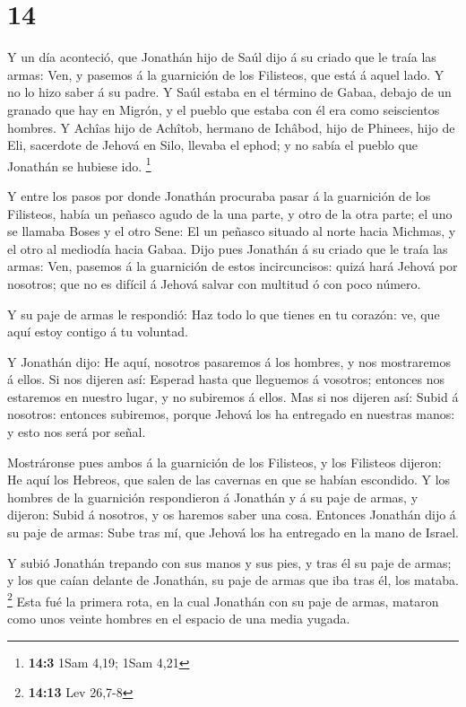 \hypertarget{section-13}{%
\section{14}\label{section-13}}

 Y un día aconteció, que Jonathán hijo de Saúl dijo á su
criado que le traía las armas: Ven, y pasemos á la guarnición de los
Filisteos, que está á aquel lado. Y no lo hizo saber á su padre.
 Y Saúl estaba en el término de Gabaa, debajo de un granado
que hay en Migrón, y el pueblo que estaba con él era como seiscientos
hombres.  Y Achîas hijo de Achîtob, hermano de Ichâbod, hijo
de Phinees, hijo de Eli, sacerdote de Jehová en Silo, llevaba el ephod;
y no sabía el pueblo que Jonathán se hubiese ido. \footnote{\textbf{14:3}
  1Sam 4,19; 1Sam 4,21}

 Y entre los pasos por donde Jonathán procuraba pasar á la
guarnición de los Filisteos, había un peñasco agudo de la una parte, y
otro de la otra parte; el uno se llamaba Boses y el otro Sene:
 El un peñasco situado al norte hacia Michmas, y el otro al
mediodía hacia Gabaa.  Dijo pues Jonathán á su criado que le
traía las armas: Ven, pasemos á la guarnición de estos incircuncisos:
quizá hará Jehová por nosotros; que no es difícil á Jehová salvar con
multitud ó con poco número.

 Y su paje de armas le respondió: Haz todo lo que tienes en
tu corazón: ve, que aquí estoy contigo á tu voluntad.

 Y Jonathán dijo: He aquí, nosotros pasaremos á los hombres,
y nos mostraremos á ellos.  Si nos dijeren así: Esperad
hasta que lleguemos á vosotros; entonces nos estaremos en nuestro lugar,
y no subiremos á ellos.  Mas si nos dijeren así: Subid á
nosotros: entonces subiremos, porque Jehová los ha entregado en nuestras
manos: y esto nos será por señal.

 Mostráronse pues ambos á la guarnición de los Filisteos, y
los Filisteos dijeron: He aquí los Hebreos, que salen de las cavernas en
que se habían escondido.  Y los hombres de la guarnición
respondieron á Jonathán y á su paje de armas, y dijeron: Subid á
nosotros, y os haremos saber una cosa. Entonces Jonathán dijo á su paje
de armas: Sube tras mí, que Jehová los ha entregado en la mano de
Israel.

 Y subió Jonathán trepando con sus manos y sus pies, y tras
él su paje de armas; y los que caían delante de Jonathán, su paje de
armas que iba tras él, los mataba. \footnote{\textbf{14:13} Lev 26,7-8}
 Esta fué la primera rota, en la cual Jonathán con su paje
de armas, mataron como unos veinte hombres en el espacio de una media
yugada.

